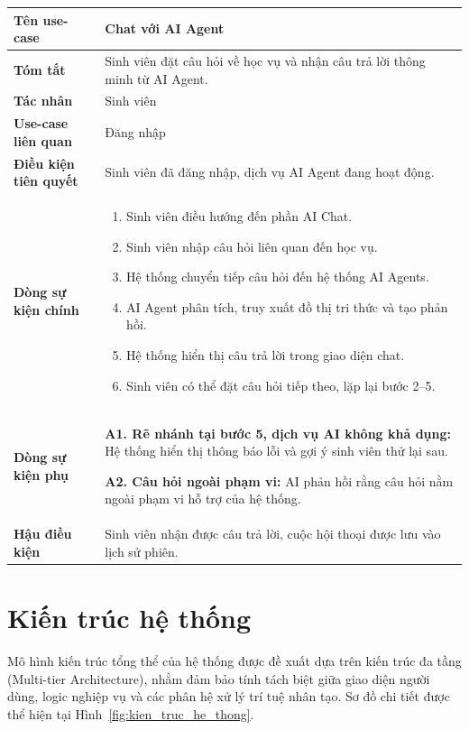 \begin{longtable}{|>{\raggedright\arraybackslash}p{4.2cm}|>{\raggedright\arraybackslash}p{9.8cm}|}
	\hline
	\textbf{Tên use-case} & Chat với AI Agent \\ \hline
	\textbf{Tóm tắt} & Sinh viên đặt câu hỏi về học vụ và nhận câu trả lời thông minh từ AI Agent. \\ \hline
	\textbf{Tác nhân} & Sinh viên \\ \hline
	\textbf{Use-case liên quan} & Đăng nhập \\ \hline
	\textbf{Điều kiện tiên quyết} & Sinh viên đã đăng nhập, dịch vụ AI Agent đang hoạt động. \\ \hline
	\textbf{Dòng sự kiện chính} &
	\begin{enumerate}
		\item Sinh viên điều hướng đến phần AI Chat.
		\item Sinh viên nhập câu hỏi liên quan đến học vụ.
		\item Hệ thống chuyển tiếp câu hỏi đến hệ thống AI Agents.
		\item AI Agent phân tích, truy xuất đồ thị tri thức và tạo phản hồi.
		\item Hệ thống hiển thị câu trả lời trong giao diện chat.
		\item Sinh viên có thể đặt câu hỏi tiếp theo, lặp lại bước 2--5.
	\end{enumerate} \\ \hline
	\textbf{Dòng sự kiện phụ} & \textbf{A1. Rẽ nhánh tại bước 5, dịch vụ AI không khả dụng:} Hệ thống hiển thị thông báo lỗi và gợi ý sinh viên thử lại sau.\par\medskip
	\textbf{A2. Câu hỏi ngoài phạm vi:} AI phản hồi rằng câu hỏi nằm ngoài phạm vi hỗ trợ của hệ thống. \\ \hline
	\textbf{Hậu điều kiện} & Sinh viên nhận được câu trả lời, cuộc hội thoại được lưu vào lịch sử phiên. \\ \hline
\end{longtable}

\setcounter{secnumdepth}{4}
\setcounter{tocdepth}{4}

\section{Kiến trúc hệ thống}

Mô hình kiến trúc tổng thể của hệ thống được đề xuất dựa trên kiến trúc đa tầng (Multi-tier Architecture), nhằm đảm bảo tính tách biệt giữa giao diện người dùng, logic nghiệp vụ và các phân hệ xử lý trí tuệ nhân tạo. Sơ đồ chi tiết được thể hiện tại Hình~\ref{fig:kien_truc_he_thong}.


